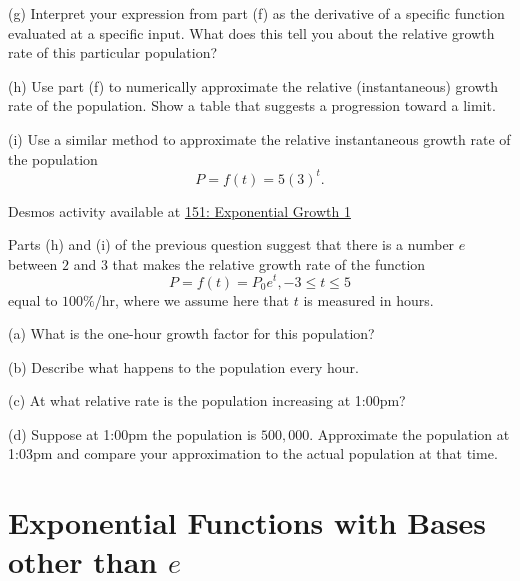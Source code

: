 \documentclass{ximera}
\begin{document}
\begin{question}
(g) Interpret your expression from part (f) as the derivative of a specific function evaluated at a specific input. What does this tell you about the relative growth rate of this particular population?

(h) Use part (f) to numerically approximate the relative (instantaneous) growth rate of the population. Show a table that suggests a progression toward a limit.

(i) Use a similar method to approximate the relative instantaneous growth rate of the population
\[
   P = f(t) = 5 (3)^t .
\]



\begin{onlineOnly}
    \begin{center}
\end{center}
\end{onlineOnly}


Desmos activity available at \href{https://www.desmos.com/calculator/omjbec2hpu}{151: Exponential Growth 1}
\end{question}


\begin{question}  \label{Qcgbt4tt}
Parts (h) and (i) of the previous question suggest that there is a number $e$ between $2$ and $3$ that makes the 
relative growth rate of the function 
\[
         P = f(t) = P_0 e^t , -3\leq t \leq 5
\]
equal to $100\%$/hr, where we assume here that $t$ is measured in hours. 

(a) What is the one-hour growth factor for this population?

(b) Describe what happens to the population every hour.

(c) At what relative rate is the population increasing at 1:00pm?

(d) Suppose at 1:00pm the population is $500,000$. Approximate the population at 1:03pm and compare your approximation to the actual population at that time.
\end{question}


\section*{Exponential Functions with Bases other than $e$}
\end{document}
